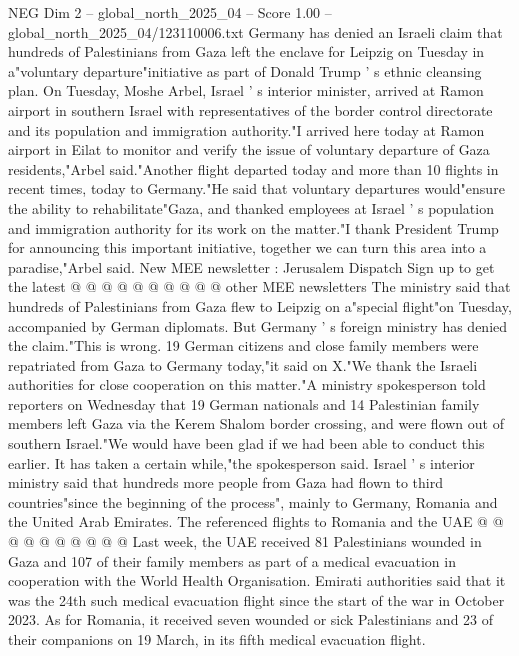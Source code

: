 \begin{textsample}{NEG Dim 2 – global\_north\_2025\_04 – Score 1.00 – global\_north\_2025\_04/123110006.txt}  \label{ex:f2_neg_020}
Germany has denied an Israeli claim that hundreds of Palestinians from Gaza left the enclave for Leipzig on Tuesday in a"voluntary departure"initiative as part of Donald Trump ' s ethnic cleansing plan.
On Tuesday, Moshe Arbel, Israel ' s interior minister, arrived at Ramon airport in southern Israel with representatives of the border control directorate and its population and immigration authority."I arrived here today at Ramon airport in Eilat to monitor and verify the issue of voluntary departure of Gaza residents,"Arbel said."Another flight departed today and more than 10 flights in recent times, today to Germany."He said that voluntary departures would"ensure the ability to rehabilitate"Gaza, and thanked employees at Israel ' s population and immigration authority for its work on the matter."I thank President Trump for announcing this important initiative, together we can turn this area into a paradise,"Arbel said.
New MEE newsletter : Jerusalem Dispatch Sign up to get the latest @ @ @ @ @ @ @ @ @ @ other MEE newsletters The ministry said that hundreds of Palestinians from Gaza flew to Leipzig on a"special flight"on Tuesday, accompanied by German diplomats.
But Germany ' s foreign ministry has denied the claim."This is wrong. 19 German citizens and close family members were repatriated from Gaza to Germany today,"it said on X."We thank the Israeli authorities for close cooperation on this matter."A ministry spokesperson told reporters on Wednesday that 19 German nationals and 14 Palestinian family members left Gaza via the Kerem Shalom border crossing, and were flown out of southern Israel."We would have been glad if we had been able to conduct this earlier.
It has taken a certain while,"the spokesperson said.
Israel ' s interior ministry said that hundreds more people from Gaza had flown to third countries"since the beginning of the process", mainly to Germany, Romania and the United Arab Emirates.
The referenced flights to Romania and the UAE @ @ @ @ @ @ @ @ @ @ Last week, the UAE received 81 Palestinians wounded in Gaza and 107 of their family members as part of a medical evacuation in cooperation with the World Health Organisation.
Emirati authorities said that it was the 24th such medical evacuation flight since the start of the war in October 2023.
As for Romania, it received seven wounded or sick Palestinians and 23 of their companions on 19 March, in its fifth medical evacuation flight.

\end{textsample}
